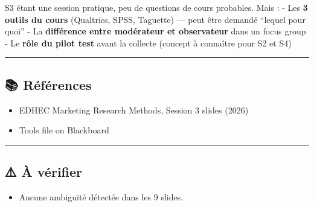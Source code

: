 \documentclass[
]{article}
\providecommand{\tightlist}{%
  \setlength{\itemsep}{0pt}\setlength{\parskip}{0pt}}
\begin{document}
S3 étant une session pratique, peu de questions de cours probables. Mais
: - Les \textbf{3 outils du cours} (Qualtrics, SPSS, Taguette) --- peut
être demandé ``lequel pour quoi'' - La \textbf{différence entre
modérateur et observateur} dans un focus group - Le \textbf{rôle du
pilot test} avant la collecte (concept à connaître pour S2 et S4)

\begin{center}\rule{0.5\linewidth}{0.5pt}\end{center}

\subsection{📚 Références}\label{ruxe9fuxe9rences}

\begin{itemize}
\tightlist
\item
  EDHEC Marketing Research Methods, Session 3 slides (2026)
\item
  Tools file on Blackboard
\end{itemize}

\begin{center}\rule{0.5\linewidth}{0.5pt}\end{center}

\subsection{⚠️ À vérifier}\label{uxe0-vuxe9rifier}

\begin{itemize}
\tightlist
\item
  Aucune ambiguïté détectée dans les 9 slides.
\end{itemize}
\end{document}

